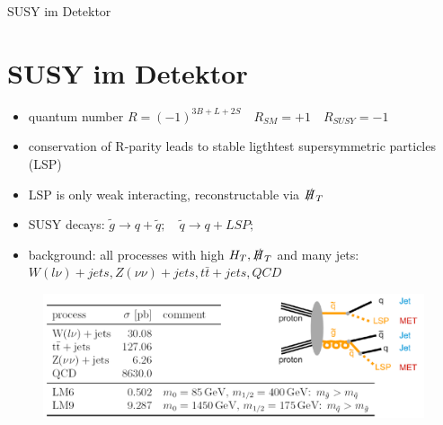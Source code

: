 \begin{frame}{SUSY im Detektor}
\section{SUSY im Detektor}

\begin{itemize}
\item quantum number $R=(-1)^{3B+L+2S} \quad R_{SM}=+1 \quad R_{SUSY}=-1$ \\
\item conservation of R-parity leads to stable ligthtest supersymmetric particles (LSP)\\
\item LSP is only weak interacting, reconstructable via $\slashed{H}_T$ \\
\item SUSY decays: \quad $\tilde{g} \rightarrow q +\tilde{q};\quad  \tilde{q} \rightarrow q + LSP;$\\ %
\item background: all processes with high $H_T, \slashed{H}_T$ and many jets:
$W(l\nu)+jets, Z(\nu\nu)+jets, t\bar{t}+jets, QCD$ 

\end{itemize}

\begin{figure}[H]
	\centering
	 \includegraphics[width=\textwidth,]{figures/feynman+bkg.png}
\end{figure}
\end{frame}

